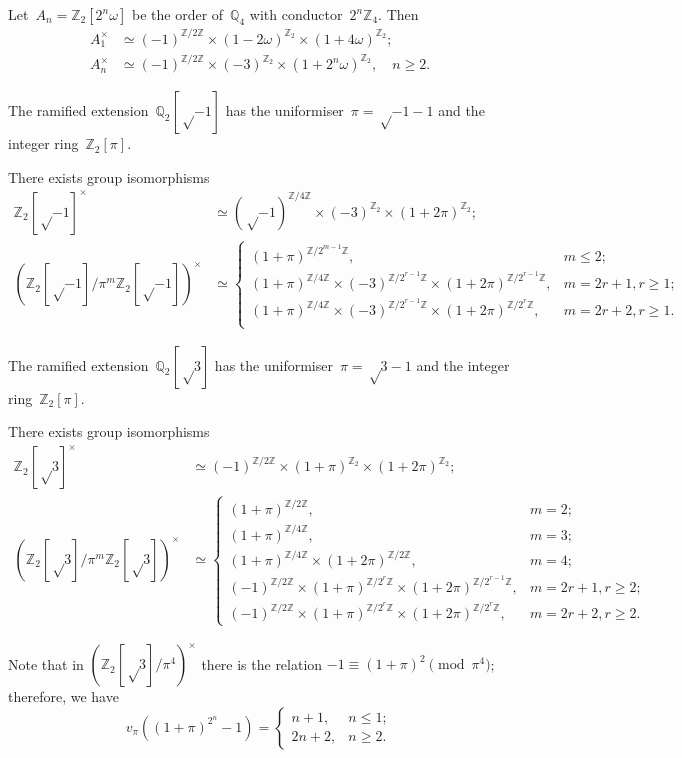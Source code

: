 \documentclass{article}
\begin{document}
\begin{prop}
Let~$A_n = ℤ_2[2^n ω]$ be the order of~$ℚ_4$ with conductor~$2^n ℤ_4$.
Then
\begin{align*}
A_1^{×} &≃ (-1)^{ℤ/2ℤ} × (1-2ω)^{ℤ_2} × (1 + 4 ω)^{ℤ_2};\\
A_n^{×} &≃ (-1)^{ℤ/2ℤ} × (-3)^{ℤ_2} × (1+2^nω)^{ℤ_2},\quad n ≥ 2.
\end{align*}
\end{prop}


The ramified extension~$ℚ_2[√{-1}]$ has the uniformiser~$π = √{-1}-1$ and
the integer ring~$ℤ_2[π]$. 
\begin{prop}
There exists group isomorphisms
\begin{align*}
ℤ_2[√{-1}]^{×} &≃ (√{-1})^{ℤ/4ℤ} × (-3)^{ℤ_2} × (1+2π)^{ℤ_2};\\
(ℤ_2[√{-1}]/π^m ℤ_2[√{-1}])^{×} &≃\begin{cases}
(1+π)^{ℤ/2^{m-1}ℤ},&m ≤ 2;\\
(1+π)^{ℤ/4ℤ} ×(-3)^{ℤ/2^{r-1} ℤ} ×(1+2π)^{ℤ/2^{r-1}ℤ},&m=2r+1,r ≥ 1;\\
(1+π)^{ℤ/4ℤ} ×(-3)^{ℤ/2^{r-1} ℤ} ×(1+2π)^{ℤ/2^{r}ℤ},&m=2r+2,r ≥ 1.\\
\end{cases}\end{align*}
\end{prop}

The ramified extension~$ℚ_2[√{3}]$ has the uniformiser~$π = √{3}-1$ and
the integer ring~$ℤ_2[π]$.
\begin{prop}
There exists group isomorphisms
\begin{align*}
ℤ_2[√{3}]^{×} &≃ (-1)^{ℤ/2ℤ} × (1+π)^{ℤ_2} × (1+2π)^{ℤ_2};\\
(ℤ_2[√{3}]/π^m ℤ_2[√{3}])^{×} &≃\begin{cases}
(1+π)^{ℤ/2ℤ},&m = 2;\\
(1+π)^{ℤ/4ℤ},&m = 3;\\
(1+π)^{ℤ/4ℤ} × (1+2π)^{ℤ/2ℤ},&m = 4;\\
(-1)^{ℤ/2ℤ} × (1+π)^{ℤ/2^rℤ} × (1+2π)^{ℤ/2^{r-1} ℤ},&m = 2r+1, r ≥ 2;\\
(-1)^{ℤ/2ℤ} × (1+π)^{ℤ/2^r ℤ} × (1+2π)^{ℤ/2^r ℤ},&m = 2r+2, r ≥ 2.
\end{cases}
\end{align*}
\end{prop}

Note that in $(ℤ_2[√{3}]/π^4)^{×}$ there is the relation $-1 ≡ (1+π)^2
\pmod{π^4}$; therefore, we have
\begin{equation}
v_{π} ((1+π)^{2^n} - 1) = \begin{cases}n+1,& n ≤ 1;\\2n+2,&n ≥ 2. \end{cases}
\end{equation}
\end{document}
